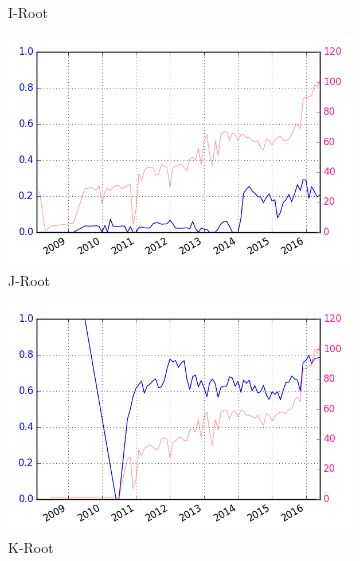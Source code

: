 \begin{appendices}
\begin{figure}[!htb]
\begin{subfigure}{.32\textwidth}
			\caption{I-Root}
			\label{fig:convergence-i}
		\end{subfigure}								
		\begin{subfigure}{.32\textwidth}
			\centering
			\includegraphics[width=\linewidth]{img/convergence_over_time_j.png}
			\caption{J-Root}
			\label{fig:convergence-j}
		\end{subfigure}										
		\begin{subfigure}{.32\textwidth}
			\centering
			\includegraphics[width=\linewidth]{img/convergence_over_time_k.png}
			\caption{K-Root}
			\label{fig:convergence-k}
		\end{subfigure}											
		\begin{subfigure}{.32\textwidth}
			\centering

\end{subfigure}
\end{figure}
\end{appendices}
